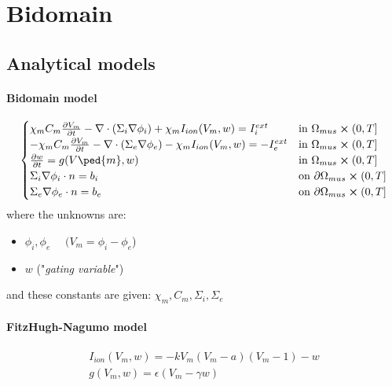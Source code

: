 \documentclass[a4paper]{article}
\begin{document}
\newpage

\section{Bidomain}
\vspace{5mm}
\subsection{Analytical models}
\vspace{5mm}
\paragraph{Bidomain model}
\begin{equation}
\begin{cases}
\chi_m C_m\pdv{V_m}{t} - \nabla \cdot (\Sigma_i \nabla \phi_i) + \chi_m I_{ion}(V_m,w) = I_i^{ext}    & \text{in } \Omega_{mus} \cross (0,T]
\\
-\chi_m C_m\pdv{V_m}{t} - \nabla \cdot (\Sigma_e \nabla \phi_e) - \chi_m I_{ion}(V_m,w) = -I_e^{ext}    & \text{in } \Omega_{mus} \cross (0,T]
\\
\pdv{w}{t} = g(V\ped{m}, w)  & \text{in } \Omega_{mus} \cross (0,T]
\\
\Sigma_i\nabla \phi_i \cdot n = b_i   & \text{on } \partial \Omega_{mus} \cross (0,T]
\\
\Sigma_e\nabla \phi_e \cdot n = b_e   & \text{on } \partial \Omega_{mus} \cross (0,T]
\end{cases}
\end{equation}
\vspace{4mm}\newline
where the unknowns are:
\begin{itemize}
	\item $\phi_i, \phi_e$  $\quad (V_m = \phi_i-\phi_e$)
	\item $w$  ("\emph{gating variable}")
\end{itemize}
and these constants are given: $\chi_m, C_m, \Sigma_i, \Sigma_e$

\paragraph{FitzHugh-Nagumo model}
\begin{equation}
\begin{gathered}
I_{ion}(V_m, w) = -kV_m(V_m-a)(V_m-1) -w
\\
g(V_m,w) = \epsilon(V_m -\gamma w)
\end{gathered}
\end{equation}
\end{document}
